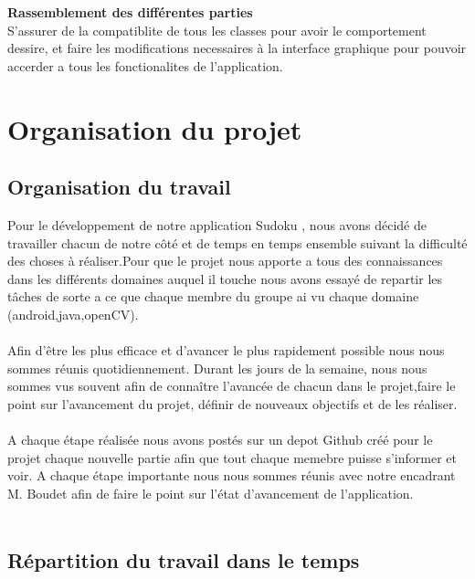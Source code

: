 \documentclass{article}
\begin{document}
\textbf{Rassemblement des différentes parties}\\
S'assurer de la compatiblite de tous les classes pour avoir le comportement dessire, et faire les modifications necessaires à la interface graphique pour pouvoir accerder a tous les fonctionalites de l'application.














\newpage
\section{Organisation du projet}
\subsection{Organisation du travail}
Pour le développement de notre application Sudoku , nous avons décidé de travailler chacun de notre côté et de temps en temps ensemble suivant la difficulté des choses à réaliser.Pour que le projet nous apporte a tous des connaissances dans les différents domaines auquel il touche nous avons essayé de repartir les tâches de sorte a ce que chaque membre du groupe ai vu chaque domaine (android,java,openCV).\\\\
Afin d’être les plus efficace et d’avancer le plus rapidement possible nous nous sommes réunis
quotidiennement. Durant les jours de la semaine, nous nous sommes vus souvent afin de connaître l'avancée de chacun dans le projet,faire le point sur l’avancement du projet, définir de nouveaux objectifs et de les réaliser.\\\\
A chaque étape réalisée nous avons postés sur un depot Github créé pour le projet chaque nouvelle partie afin que tout chaque memebre puisse s'informer et voir.
A chaque étape importante nous nous sommes réunis avec notre encadrant M. Boudet afin de faire le point sur l’état d’avancement de l’application.\\\\

\subsection{Répartition du travail dans le temps}
\end{document}
